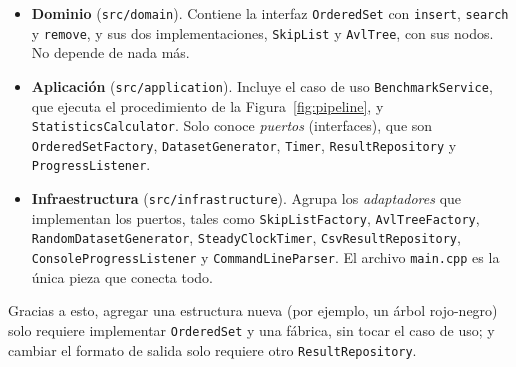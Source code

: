 \documentclass[11pt,a4paper]{article}
\begin{document}
\begin{itemize}
  \item \textbf{Dominio} (\texttt{src/domain}). Contiene la interfaz
  \texttt{OrderedSet} con \texttt{insert}, \texttt{search} y
  \texttt{remove}, y sus dos implementaciones, \texttt{SkipList} y
  \texttt{AvlTree}, con sus nodos. No depende de nada más.
  \item \textbf{Aplicación} (\texttt{src/application}). Incluye el caso de uso
  \texttt{BenchmarkService}, que ejecuta el procedimiento de la
  Figura~\ref{fig:pipeline}, y \texttt{StatisticsCalculator}. Solo conoce
  \emph{puertos} (interfaces), que son \texttt{OrderedSetFactory},
  \texttt{DatasetGenerator}, \texttt{Timer}, \texttt{ResultRepository} y
  \texttt{ProgressListener}.
  \item \textbf{Infraestructura} (\texttt{src/infrastructure}). Agrupa los
  \emph{adaptadores} que implementan los puertos, tales como
  \texttt{SkipListFactory}, \texttt{AvlTreeFactory},
  \texttt{RandomDatasetGenerator}, \texttt{SteadyClockTimer},
  \texttt{CsvResultRepository}, \texttt{ConsoleProgressListener} y
  \texttt{CommandLineParser}. El archivo \texttt{main.cpp} es la única pieza
  que conecta todo.
\end{itemize}

Gracias a esto, agregar una estructura nueva (por ejemplo, un árbol
rojo-negro) solo requiere implementar \texttt{OrderedSet} y una fábrica, sin
tocar el caso de uso; y cambiar el formato de salida solo requiere otro
\texttt{ResultRepository}.
\end{document}
